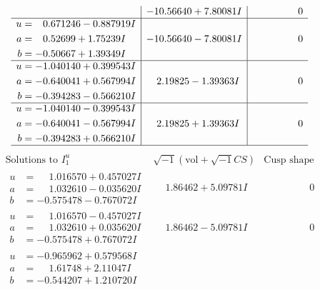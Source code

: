 \documentclass[1p]{elsarticle_modified}
\theoremstyle{definition}
\newcommand{\I}{\sqrt{-1}}
\begin{document}
$$\begin{array}{c|c|c}
 & -10.56640 + 7.80081 I & \phantom{-0.000000 } 0 \\ \hline\begin{aligned}
u &= \phantom{-}0.671246 - 0.887919 I \\
a &= \phantom{-}0.52699 + 1.75239 I \\
b &= -0.50667 + 1.39349 I\end{aligned}
 & -10.56640 - 7.80081 I & \phantom{-0.000000 } 0 \\ \hline\begin{aligned}
u &= -1.040140 + 0.399543 I \\
a &= -0.640041 + 0.567994 I \\
b &= -0.394283 - 0.566210 I\end{aligned}
 & \phantom{-}2.19825 - 1.39363 I & \phantom{-0.000000 } 0 \\ \hline\begin{aligned}
u &= -1.040140 - 0.399543 I \\
a &= -0.640041 - 0.567994 I \\
b &= -0.394283 + 0.566210 I\end{aligned}
 & \phantom{-}2.19825 + 1.39363 I & \phantom{-0.000000 } 0\\
 \hline 
 \end{array}$$\newpage$$\begin{array}{c|c|c}  
\text{Solutions to }I^u_{1}& \I (\text{vol} + \sqrt{-1}CS) & \text{Cusp shape}\\
 \hline 
\begin{aligned}
u &= \phantom{-}1.016570 + 0.457027 I \\
a &= \phantom{-}1.032610 - 0.035620 I \\
b &= -0.575478 - 0.767072 I\end{aligned}
 & \phantom{-}1.86462 + 5.09781 I & \phantom{-0.000000 } 0 \\ \hline\begin{aligned}
u &= \phantom{-}1.016570 - 0.457027 I \\
a &= \phantom{-}1.032610 + 0.035620 I \\
b &= -0.575478 + 0.767072 I\end{aligned}
 & \phantom{-}1.86462 - 5.09781 I & \phantom{-0.000000 } 0 \\ \hline\begin{aligned}
u &= -0.965962 + 0.579568 I \\
a &= \phantom{-}1.61748 + 2.11047 I \\
b &= -0.544207 + 1.210720 I\end{aligned}

\end{array}$$
\end{document}
